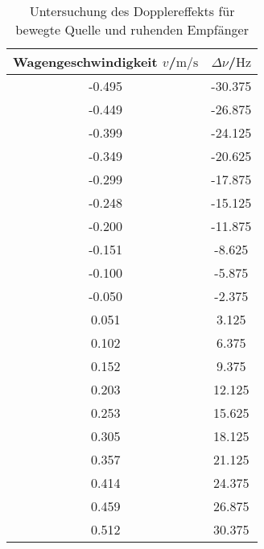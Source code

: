 \begin{table}
	\centering
	\caption{Untersuchung des Dopplereffekts für bewegte Quelle und ruhenden Empfänger}
	\label{tab:direkt}
	\begin{tabular}{cc}
		\toprule
		Wagengeschwindigkeit $v$/$\si{\meter\per\second}$ & $\Delta \nu$/$\si{\Hz}$ \\
		\midrule
		-0.495                                            & -30.375                 \\
		-0.449                                            & -26.875                 \\
		-0.399                                            & -24.125                 \\
		-0.349                                            & -20.625                 \\
		-0.299                                            & -17.875                 \\
		-0.248                                            & -15.125                 \\
		-0.200                                            & -11.875                 \\
		-0.151                                            & -8.625                  \\
		-0.100                                            & -5.875                  \\
		-0.050                                            & -2.375                  \\
		0.051                                             & 3.125                   \\
		0.102                                             & 6.375                   \\
		0.152                                             & 9.375                   \\
		0.203                                             & 12.125                  \\
		0.253                                             & 15.625                  \\
		0.305                                             & 18.125                  \\
		0.357                                             & 21.125                  \\
		0.414                                             & 24.375                  \\
		0.459                                             & 26.875                  \\
		0.512                                             & 30.375                  \\
		\bottomrule
	\end{tabular}
\end{table}
